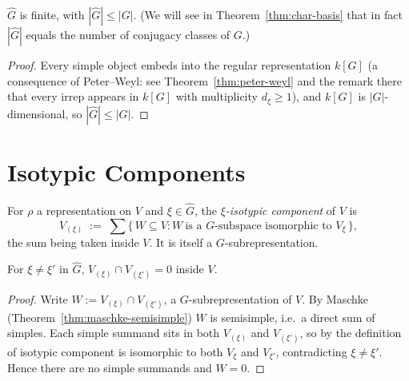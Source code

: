 \begin{theorem}
  \label{thm:Ghat-finite}
  $\hat G$ is finite, with $|\hat G| \le |G|$. (We will see in
  Theorem~\ref{thm:char-basis} that in fact $|\hat G|$ equals the number of
  conjugacy classes of $G$.)
\end{theorem}

\begin{proof}
  Every simple object embeds into the regular representation $k[G]$ (a
  consequence of Peter–Weyl: see Theorem~\ref{thm:peter-weyl} and the remark
  there that every irrep appears in $k[G]$ with multiplicity $d_\xi \ge 1$),
  and $k[G]$ is $|G|$-dimensional, so $|\hat G| \le |G|$.
\end{proof}

\section{Isotypic Components}

\begin{definition}
  \label{def:isotypic-component}
  For $\rho$ a representation on $V$ and $\xi \in \hat G$, the
  \emph{$\xi$-isotypic component} of $V$ is
  \[
    V_{(\xi)} \;:=\; \sum \big\{\, W \subseteq V : W\ \text{is a $G$-subspace
    isomorphic to } V_\xi\,\big\},
  \]
  the sum being taken inside $V$. It is itself a $G$-subrepresentation.
\end{definition}

\begin{lemma}
  \label{lem:isotypic-disjoint}
  For $\xi \ne \xi'$ in $\hat G$, $V_{(\xi)} \cap V_{(\xi')} = 0$ inside $V$.
\end{lemma}

\begin{proof}
  Write $W := V_{(\xi)} \cap V_{(\xi')}$, a $G$-subrepresentation of $V$.
  By Maschke (Theorem~\ref{thm:maschke-semisimple}) $W$ is semisimple,
  i.e.\ a direct sum of simples. Each simple summand sits in both
  $V_{(\xi)}$ and $V_{(\xi')}$, so by the definition of isotypic component
  is isomorphic to both $V_\xi$ and $V_{\xi'}$, contradicting $\xi \ne \xi'$.
  Hence there are no simple summands and $W = 0$.
\end{proof}

